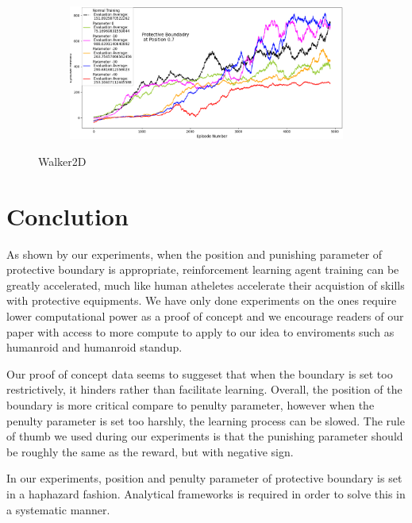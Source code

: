 \documentclass[journal]{IEEEtran}
\begin{document}
\begin{figure}
\begin{subfigure}[b]{0.5\textwidth}
    \end{subfigure}
    \vspace*{0.0mm}
    \begin{subfigure}[b]{0.5\textwidth}
      \centering
      \includegraphics[width=\textwidth]{Walker_with_Boundary_at_0.7.png}
    \end{subfigure}
    \caption{Walker2D}
    \label{fig:Walker}
\end{figure}


\section{Conclution}
As shown by our experiments, when the position and punishing parameter of protective boundary is appropriate, reinforcement learning agent training can be greatly accelerated, much like human atheletes accelerate their acquistion of skills with protective equipments. We have only done experiments on the ones require lower computational power as a proof of concept and we encourage readers of our paper with access to more compute to apply to our idea to enviroments such as humanroid and humanroid standup.

 Our proof of concept data seems to suggeset that when the boundary is set too restrictively, it hinders rather than facilitate learning. Overall, the position of the boundary is more critical compare to penulty parameter, however when the penulty parameter is set too harshly, the learning process can be slowed. The rule of thumb we used during our experiments is that the punishing parameter should be roughly the same as the reward, but with negative sign.

In our experiments, position and penulty parameter of protective boundary is set in a haphazard fashion. Analytical frameworks is required in order to solve this in a systematic manner.



\end{document}
